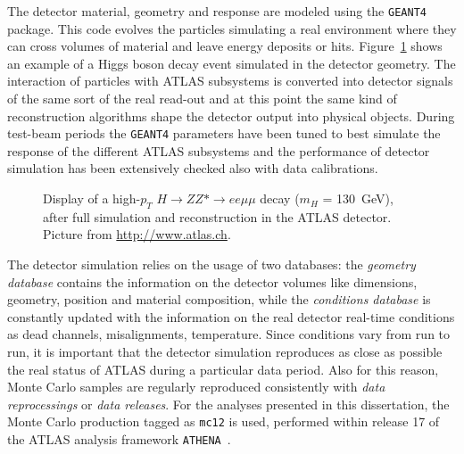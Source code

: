 The detector material, geometry and response %
are modeled using the {\tt GEANT4}~\cite{geant} package.
This code evolves the particles simulating a real environment
where they can cross volumes of material and leave energy
deposits or hits. Figure~\ref{fig:atlasdisplay} shows an
example of a Higgs boson decay event simulated in the detector
geometry.
The interaction of particles with ATLAS subsystems is converted
into detector signals of the same sort of the real read-out and
at this point the same kind of reconstruction algorithms shape
the detector output into physical objects. During test-beam periods
the \texttt{GEANT4} parameters have been tuned to best simulate
the response of the different 
ATLAS subsystems and the performance of detector simulation
has been extensively checked also with data calibrations.

\begin{figure}[htb]\begin{center}
	\caption{Display of a high-$p_T$ $H \to ZZ*\to ee\mu\mu$ decay ($m_H$ = 130~GeV), 
        after full simulation and reconstruction in the ATLAS detector. Picture from \url{http://www.atlas.ch}. \label{fig:atlasdisplay}}
\end{center}\end{figure}


The detector simulation relies on the usage of two databases: the 
{\it geometry database} contains the information on the detector volumes
like dimensions, geometry, position and material composition, while
the {\it conditions database} is constantly updated with the information
on the real detector real-time conditions as dead channels, misalignments,
temperature. Since conditions vary from run to run, it is important that
the detector simulation reproduces as close as possible the real status
of ATLAS during a particular data period. Also for this reason, Monte
Carlo samples are regularly reproduced consistently with {\it data reprocessings}
or {\it data releases}.  For the analyses presented in this dissertation,
the Monte Carlo production tagged as \texttt{mc12} is used, performed
within release 17 of the ATLAS analysis framework \texttt{ATHENA}~\cite{Calafiura:2005zz}.



